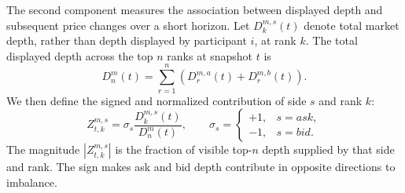 \documentclass[11pt]{article}
\newenvironment{review}{\begingroup\color{blue}}{\endgroup}
\begin{document}
The second component measures the association between displayed depth and \begin{review}subsequent price changes over a short horizon\end{review}. Let
$D^{m,s}_{k}(t)$ denote total market depth, rather than \begin{review}depth displayed by participant $i$\end{review}, at rank $k$. \begin{review}The total displayed depth across the top $n$ ranks\end{review}
at snapshot $t$ is
\begin{equation}
    D^{m}_{n}(t)
    =
    \sum_{r=1}^{n}\left(D^{m,a}_{r}(t)+D^{m,b}_{r}(t)\right).
    \label{eq:total_topn_market_depth}
\end{equation}
We then define the signed and normalized contribution of side $s$ and rank $k$:
\begin{equation}
    Z^{m,s}_{t,k}
    =
    \sigma_s\frac{D^{m,s}_{k}(t)}{D^{m}_{n}(t)},
    \qquad
    \sigma_s= \begin{cases}
        +1, & s=ask,\\
        -1, & s=bid.
    \end{cases}
    \label{eq:normalized_level_contribution}
\end{equation}
The magnitude $|Z^{m,s}_{t,k}|$ is the fraction of visible top-$n$ depth supplied by that side and rank. The sign makes ask
and bid depth contribute in opposite directions to imbalance.
\end{document}
